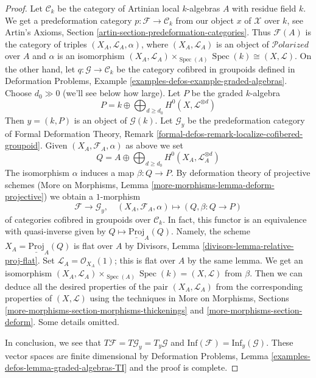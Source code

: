 \documentclass{stacks-project}
\theoremstyle{plain}
\theoremstyle{definition}
\theoremstyle{remark}
\numberwithin{equation}{subsection}
\def\Spec{\mathop{\mathrm{Spec}}}
\def\Polarizedstack{\mathcal{P}\!\mathit{olarized}}
\begin{document}
\begin{proof}
\medskip\noindent
Let $\mathcal{C}_k$ be the category of Artinian local $k$-algebras
$A$ with residue field $k$. We get a predeformation category
$p : \mathcal{F} \to \mathcal{C}_k$ from our object $x$ of $\mathcal{X}$
over $k$, see
Artin's Axioms, Section \ref{artin-section-predeformation-categories}.
Thus $\mathcal{F}(A)$ is the category of triples
$(X_A, \mathcal{L}_A, \alpha)$, where $(X_A, \mathcal{L}_A)$
is an object of $\Polarizedstack$ over $A$ and $\alpha$ is an isomorphism
$(X_A, \mathcal{L}_A) \times_{\Spec(A)} \Spec(k) \cong (X, \mathcal{L})$.
On the other hand, let $q : \mathcal{G} \to \mathcal{C}_k$
be the category cofibred in groupoids defined in
Deformation Problems, Example \ref{examples-defos-example-graded-algebras}.
Choose $d_0 \gg 0$ (we'll see below how large).
Let $P$ be the graded $k$-algebra
$$
P = k \oplus \bigoplus\nolimits_{d \geq d_0} H^0(X, \mathcal{L}^{\otimes d})
$$
Then $y = (k, P)$ is an object of $\mathcal{G}(k)$.
Let $\mathcal{G}_y$ be the predeformation category of
Formal Deformation Theory, Remark
\ref{formal-defos-remark-localize-cofibered-groupoid}.
Given $(X_A, \mathcal{F}_A, \alpha)$ as above we set
$$
Q = A \oplus \bigoplus\nolimits_{d \geq d_0} H^0(X_A, \mathcal{L}_A^{\otimes d})
$$
The isomorphism $\alpha$ induces a map $\beta : Q \to P$.
By deformation theory of projective schemes
(More on Morphisms, Lemma \ref{more-morphisms-lemma-deform-projective})
we obtain a $1$-morphism
$$
\mathcal{F} \longrightarrow \mathcal{G}_y,\quad
(X_A, \mathcal{F}_A, \alpha) \longmapsto (Q, \beta : Q \to P)
$$
of categories cofibred in groupoids over $\mathcal{C}_k$.
In fact, this functor is an equivalence with quasi-inverse
given by $Q \mapsto \underline{\text{Proj}}_A(Q)$.
Namely, the scheme $X_A = \underline{\text{Proj}}_A(Q)$
is flat over $A$ by Divisors, Lemma \ref{divisors-lemma-relative-proj-flat}.
Set $\mathcal{L}_A = \mathcal{O}_{X_A}(1)$; this is flat over $A$
by the same lemma. We get an isomorphism
$(X_A, \mathcal{L}_A) \times_{\Spec(A)} \Spec(k) = (X, \mathcal{L})$
from $\beta$. Then we can deduce all the desired properties of
the pair $(X_A, \mathcal{L}_A)$ from the corresponding properties
of $(X, \mathcal{L})$ using the techniques in
More on Morphisms, Sections
\ref{more-morphisms-section-morphisms-thickenings} and
\ref{more-morphisms-section-deform}.
Some details omitted.

\medskip\noindent
In conclusion, we see that $T\mathcal{F} = T\mathcal{G}_y = T_y\mathcal{G}$
and $\text{Inf}(\mathcal{F}) = \text{Inf}_y(\mathcal{G})$.
These vector spaces are finite dimensional by Deformation Problems, Lemma
\ref{examples-defos-lemma-graded-algebras-TI}
and the proof is complete.
\end{proof}
\end{document}
